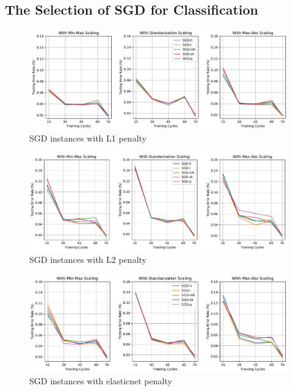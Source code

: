 \documentclass[a4paper,12pt]{article}
\begin{document}
\subsection{The Selection of SGD for Classification} \label{SGDClassifiersTests}
\begin{figure}[H]
	\centering
	\includegraphics[keepaspectratio, width=\linewidth]{graphs/SGDClassifiersWithPenaltyL1.pdf}
	\caption{SGD instances with L1 penalty}
	\label{SGDCL1}
\end{figure}
\begin{figure}[H]
	\centering
	\includegraphics[keepaspectratio, width=\linewidth]{graphs/SGDClassifiersWithPenaltyL2.pdf}
	\caption{SGD instances with L2 penalty}
	\label{SGDCL2}
\end{figure}
\begin{figure}[H]
	\centering
	\includegraphics[keepaspectratio, width=\linewidth]{graphs/SGDClassifiersWithPenaltyElasticnet.pdf}
	\caption{SGD instances with elasticnet penalty}
	\label{SGDCElasticnet}
\end{figure}
\end{document}
